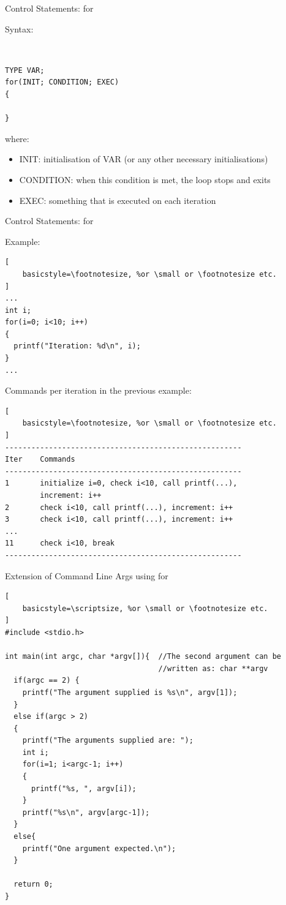 \documentclass[10pt]{beamer}
\begin{document}
\begin{frame}[fragile]{Control Statements: for}

Syntax:

\ \\

\begin{lstlisting}
TYPE VAR;
for(INIT; CONDITION; EXEC)
{
  
}
\end{lstlisting}

where:

\begin{itemize}
\item INIT: initialisation of VAR (or any other necessary initialisations)
\item CONDITION: when this condition is met, the loop stops and exits
\item EXEC: something that is executed on each iteration
\end{itemize}
\end{frame}


\begin{frame}[fragile]{Control Statements: for}

Example:

\begin{lstlisting}[
    basicstyle=\footnotesize, %or \small or \footnotesize etc.
]
...
int i;
for(i=0; i<10; i++)
{
  printf("Iteration: %d\n", i);
}
...
\end{lstlisting}

Commands per iteration in the previous example:

\begin{lstlisting}[
    basicstyle=\footnotesize, %or \small or \footnotesize etc.
]
------------------------------------------------------
Iter    Commands
------------------------------------------------------
1       initialize i=0, check i<10, call printf(...),
        increment: i++
2       check i<10, call printf(...), increment: i++
3       check i<10, call printf(...), increment: i++
...
11      check i<10, break
------------------------------------------------------
\end{lstlisting}

\end{frame}


\begin{frame}[fragile]{Extension of Command Line Args using for}
\begin{lstlisting}[
    basicstyle=\scriptsize, %or \small or \footnotesize etc.
]
#include <stdio.h>

int main(int argc, char *argv[]){  //The second argument can be
                                   //written as: char **argv
  if(argc == 2) {
    printf("The argument supplied is %s\n", argv[1]);
  }
  else if(argc > 2)
  {
    printf("The arguments supplied are: ");
    int i;
    for(i=1; i<argc-1; i++)
    {
      printf("%s, ", argv[i]);
    }
    printf("%s\n", argv[argc-1]);
  }
  else{
    printf("One argument expected.\n");
  }

  return 0;
}
\end{lstlisting}
\end{frame}
\end{document}
